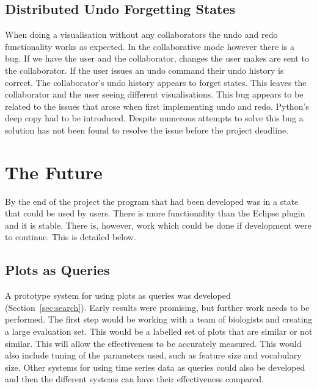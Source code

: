 \subsection{Distributed Undo Forgetting States}

When doing a visualisation without any collaborators the undo and redo functionality works as expected.  In the collaborative mode however there is a bug.  If we have the user and the collaborator, changes the user makes are sent to the collaborator.  If the user issues an undo command their undo history is correct.  The collaborator's undo history appears to forget states.  This leaves the collaborator and the user seeing different visualisations.  This bug appears to be related to the issues that arose when first implementing undo and redo. Python's deep copy had to be introduced.  Despite numerous attempts to solve this bug a solution has not been found to resolve the issue before the project deadline.

\section{The Future}

By the end of the project the program that had been developed was in a state that could be used by users.  There is more functionality than the Eclipse plugin and it is stable.  There is, however, work which could be done if development were to continue.  This is detailed below.

\subsection{Plots as Queries}
A prototype system for using plots as queries was developed (Section~\ref{sec:search}).  Early results were promising, but further work needs to be performed.  The first step would be working with a team of biologists and creating a large evaluation set. This would be a labelled set of plots that are similar or not similar.  This will allow the effectiveness to be accurately measured.  This would also include tuning of the parameters used, such as feature size and vocabulary size.  Other systems for using time series data as queries could also be developed and then the different systems can have their effectiveness compared.

